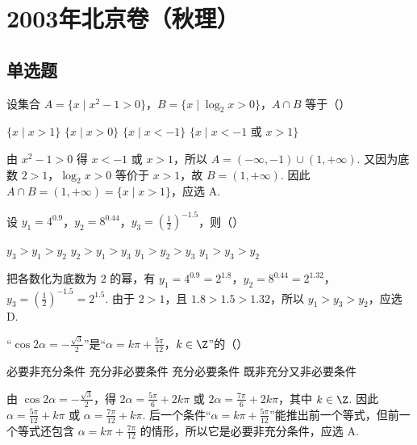 \chapter{2003年北京卷（秋理）}
\section{单选题}
\begin{problem}
设集合 \(A=\{x\mid x^2-1>0\}\)，\(B=\{x\mid \log_2 x>0\}\)，\(A\cap B\) 等于（\quad）

\choices
    {\(\{x\mid x>1\}\)}
    {\(\{x\mid x>0\}\)}
    {\(\{x\mid x<-1\}\)}
    {\(\{x\mid x<-1\text{\ 或\ }x>1\}\)}

\begin{solution}
由 \(x^2-1>0\) 得 \(x<-1\) 或 \(x>1\)，所以 \(A=(-\infty,-1)\cup(1,+\infty)\). 又因为底数 \(2>1\)，\(\log_2x>0\) 等价于 \(x>1\)，故 \(B=(1,+\infty)\). 因此 \(A\cap B=(1,+\infty)=\{x\mid x>1\}\)，应选 A.
\end{solution}
\end{problem}

\begin{problem}
设 \(y_1=4^{0.9}\)，\(y_2=8^{0.44}\)，\(y_3=\left(\frac{1}{2}\right)^{-1.5}\)，则（\quad）

\choices
    {\(y_3>y_1>y_2\)}
    {\(y_2>y_1>y_3\)}
    {\(y_1>y_2>y_3\)}
    {\(y_1>y_3>y_2\)}

\begin{solution}
把各数化为底数为 \(2\) 的幂，有 \(y_1=4^{0.9}=2^{1.8}\)，\(y_2=8^{0.44}=2^{1.32}\)，\(y_3=\left(\frac12\right)^{-1.5}=2^{1.5}\). 由于 \(2>1\)，且 \(1.8>1.5>1.32\)，所以 \(y_1>y_3>y_2\)，应选 D.
\end{solution}
\end{problem}

\begin{problem}
“\(\cos 2\alpha=-\frac{\sqrt{3}}{2}\)”是“\(\alpha=k\pi+\frac{5\pi}{12}\)，\(k\in\Z\)”的（\quad）

\choices
    {必要非充分条件}
    {充分非必要条件}
    {充分必要条件}
    {既非充分又非必要条件}

\begin{solution}
由 \(\cos 2\alpha=-\frac{\sqrt3}{2}\)，得 \(2\alpha=\frac{5\pi}{6}+2k\pi\) 或 \(2\alpha=\frac{7\pi}{6}+2k\pi\)，其中 \(k\in\Z\). 因此 \(\alpha=\frac{5\pi}{12}+k\pi\) 或 \(\alpha=\frac{7\pi}{12}+k\pi\). 后一个条件“\(\alpha=k\pi+\frac{5\pi}{12}\)”能推出前一个等式，但前一个等式还包含 \(\alpha=k\pi+\frac{7\pi}{12}\) 的情形，所以它是必要非充分条件，应选 A.
\end{solution}
\end{problem}

